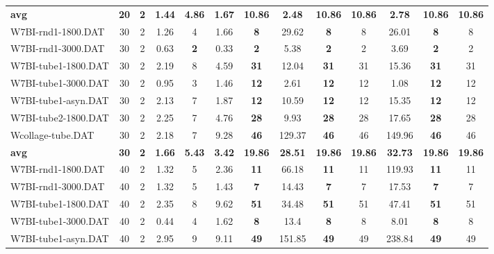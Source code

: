 \begin{table}[h]
{\begin{tabular}{lcccccccccccc}
\cline{1-13} \textbf{avg} & \textbf{20} & \textbf{2} & \textbf{1.44} & \textbf{4.86} & \textbf{1.67} & \textbf{10.86} & \textbf{2.48} & \textbf{10.86} & \textbf{10.86} & \textbf{2.78} & \textbf{10.86} & \textbf{10.86} \\ \cline{1-13}
W7BI-rnd1-1800.DAT & 30 & 2 &  \textcolor{blue2}{1.26} & 4 & 1.66 &  \textbf{8} & 29.62 &  \textbf{8} & 8 & 26.01 &  \textbf{8} & 8 \\
W7BI-rnd1-3000.DAT & 30 & 2 & 0.63 &  \textbf{2} &  \textcolor{blue2}{0.33} &  \textbf{2} & 5.38 &  \textbf{2} & 2 & 3.69 &  \textbf{2} & 2 \\
W7BI-tube1-1800.DAT & 30 & 2 &  \textcolor{blue2}{2.19} & 8 & 4.59 &  \textbf{31} & 12.04 &  \textbf{31} & 31 & 15.36 &  \textbf{31} & 31 \\
W7BI-tube1-3000.DAT & 30 & 2 &  \textcolor{blue2}{0.95} & 3 & 1.46 &  \textbf{12} & 2.61 &  \textbf{12} & 12 & 1.08 &  \textbf{12} & 12 \\
W7BI-tube1-asyn.DAT & 30 & 2 & 2.13 & 7 &  \textcolor{blue2}{1.87} &  \textbf{12} & 10.59 &  \textbf{12} & 12 & 15.35 &  \textbf{12} & 12 \\
W7BI-tube2-1800.DAT & 30 & 2 &  \textcolor{blue2}{2.25} & 7 & 4.76 &  \textbf{28} & 9.93 &  \textbf{28} & 28 & 17.65 &  \textbf{28} & 28 \\
Wcollage-tube.DAT & 30 & 2 &  \textcolor{blue2}{2.18} & 7 & 9.28 &  \textbf{46} & 129.37 &  \textbf{46} & 46 & 149.96 &  \textbf{46} & 46 \\
\cline{1-13} \textbf{avg} & \textbf{30} & \textbf{2} & \textbf{1.66} & \textbf{5.43} & \textbf{3.42} & \textbf{19.86} & \textbf{28.51} & \textbf{19.86} & \textbf{19.86} & \textbf{32.73} & \textbf{19.86} & \textbf{19.86} \\ \cline{1-13}
W7BI-rnd1-1800.DAT & 40 & 2 &  \textcolor{blue2}{1.32} & 5 & 2.36 &  \textbf{11} & 66.18 &  \textbf{11} & 11 & 119.93 &  \textbf{11} & 11 \\
W7BI-rnd1-3000.DAT & 40 & 2 &  \textcolor{blue2}{1.32} & 5 & 1.43 &  \textbf{7} & 14.43 &  \textbf{7} & 7 & 17.53 &  \textbf{7} & 7 \\
W7BI-tube1-1800.DAT & 40 & 2 &  \textcolor{blue2}{2.35} & 8 & 9.62 &  \textbf{51} & 34.48 &  \textbf{51} & 51 & 47.41 &  \textbf{51} & 51 \\
W7BI-tube1-3000.DAT & 40 & 2 &  \textcolor{blue2}{0.44} & 4 & 1.62 &  \textbf{8} & 13.4 &  \textbf{8} & 8 & 8.01 &  \textbf{8} & 8 \\
W7BI-tube1-asyn.DAT & 40 & 2 &  \textcolor{blue2}{2.95} & 9 & 9.11 &  \textbf{49} & 151.85 &  \textbf{49} & 49 & 238.84 &  \textbf{49} & 49 \\

\end{tabular}}
\end{table}
